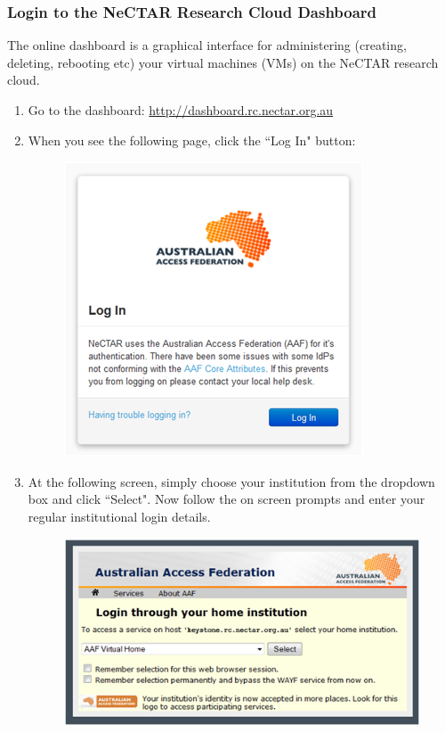 \subsubsection{Login to the NeCTAR Research Cloud Dashboard}
The online dashboard is a graphical interface for administering (creating,
deleting, rebooting etc) your virtual machines (VMs) on the NeCTAR research
cloud.

\begin{enumerate}
  \item Go to the dashboard: \url{http://dashboard.rc.nectar.org.au}
  \item When you see the following page, click the ``Log In" button:
  \begin{figure}[H]
    \centering
    \includegraphics[scale=0.5]{post-workshop/nectar/aaf_login.png}
    \caption{\label{fig:aaf_login}}
  \end{figure}
  \item At the following screen, simply choose your institution from the
  dropdown box and click ``Select". Now follow the on screen prompts and enter
  your regular institutional login details.
  \begin{figure}[H]
    \centering
    \includegraphics[scale=0.5]{post-workshop/nectar/aaf_home_institute.png}

\end{figure}
\end{enumerate}
